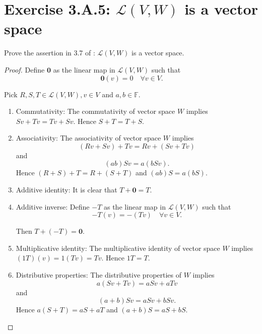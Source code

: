 \section{Exercise 3.A.5: $\mathcal{L}(V, W)$ is a vector space}
Prove the assertion in 3.7 of \cite{axler2014linear}: $\mathcal{L}(V, W)$ is a vector space.
\begin{proof}
Define $\mathbf{0}$ as the linear map in $\mathcal{L}(V,W)$ such that\[\
\mathbf{0}(v)=0\quad\forall v\in V.
\]

Pick $R,S,T\in\mathcal{L}(V,W), v\in V$ and $a,b\in\mathbb{F}$.

\begin{enumerate}
\item Commutativity: The commutativity of vector space $W$ implies $Sv+Tv=Tv+Sv$. Hence $S+T=T+S$.
\item Associativity: The associativity of vector space $W$ implies\[(Rv+Sv)+Tv=Rv+(Sv+Tv)\]and\[(ab)Sv=a(bSv).\] Hence $(R+S)+T=R+(S+T)$ and $(ab)S=a(bS)$.
\item Additive identity: It is clear that $T+\mathbf{0}=T$.
\item Additive inverse: Define $-T$ as the linear map in $\mathcal{L}(V,W)$ such that\[
-T(v)=-(Tv)\quad\forall v\in V.
\]

Then $T+(-T)=\mathbf{0}$.
\item Multiplicative identity: The multiplicative identity of vector space $W$ implies $(1T)(v)=1(Tv)=Tv$. Hence $1T=T$.
\item Distributive properties: The distributive properties of $W$ implies\[a(Sv+Tv)=aSv+aTv\]and\[(a+b)Sv=aSv+bSv.\]Hence $a(S+T)=aS+aT$ and $(a+b)S=aS+bS$.
\end{enumerate}
\end{proof}
